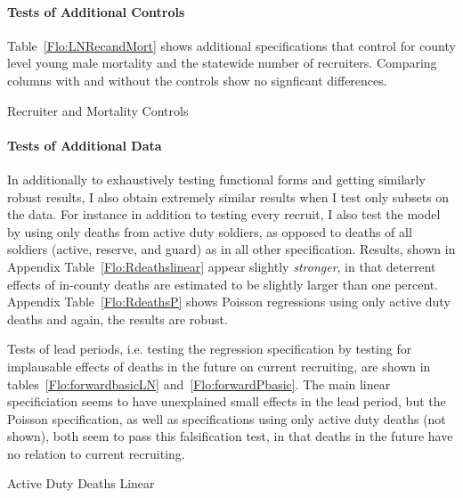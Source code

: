 \documentclass[12pt] {article}
\begin{document}
\paragraph{Tests of Additional Controls}
Table~\ref{Flo:LNRecandMort} shows additional specifications that control for county level young male mortality and the statewide number of recruiters. Comparing columns with and without the controls show no signficant differences.

\begin{table}
\caption{Recruiter and Mortality Controls}
\label{Flo:LNRecandMort}
\end{table}


\paragraph{Tests of Additional Data}
In additionally to exhaustively testing functional forms and getting similarly robust results, I also obtain extremely similar results when I test only subsets on the data. For instance 
in addition to testing every recruit, I also test the model by using only deaths from active duty soldiers, as opposed to deaths of all soldiers (active, reserve, and guard) as in all other specification. Results, shown in Appendix Table~\ref{Flo:Rdeathslinear} appear slightly \textit{stronger}, in that deterrent effects of in-county deaths are estimated to be slightly larger than one percent. Appendix Table~\ref{Flo:RdeathsP} shows Poisson regressions using only active duty deaths and again, the results are robust.

Tests of lead periods, i.e. testing the regression specification by testing for implausable effects of deaths in the future on current recruiting, are shown in tables~\ref{Flo:forwardbasicLN} and~\ref{Flo:forwardPbasic}. The main linear specificiation seems to have unexplained small effects in the lead period, but the Poisson specification, as well as specifications using only active duty deaths (not shown), both seem to pass this falsification test, in that deaths in the future have no relation to current recruiting. 



\begin{table}
\caption{Active Duty Deaths Linear}
\label{Flo:Rdeathslinear}
\scalebox{0.9}{

}
\end{table}
\end{document}
